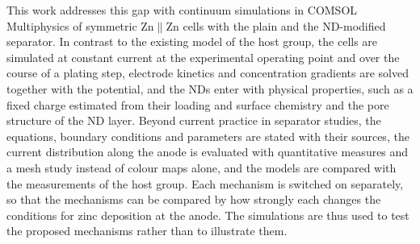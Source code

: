This work addresses this gap with continuum simulations in COMSOL Multiphysics of symmetric Zn$\|$Zn cells with the plain and the ND-modified separator.
In contrast to the existing model of the host group, the cells are simulated at constant current at the experimental operating point and over the course of a plating step, electrode kinetics and concentration gradients are solved together with the potential, and the NDs enter with physical properties, such as a fixed charge estimated from their loading and surface chemistry and the pore structure of the ND layer.
Beyond current practice in separator studies, the equations, boundary conditions and parameters are stated with their sources, the current distribution along the anode is evaluated with quantitative measures and a mesh study instead of colour maps alone, and the models are compared with the measurements of the host group.
Each mechanism is switched on separately, so that the mechanisms can be compared by how strongly each changes the conditions for zinc deposition at the anode.
The simulations are thus used to test the proposed mechanisms rather than to illustrate them.
